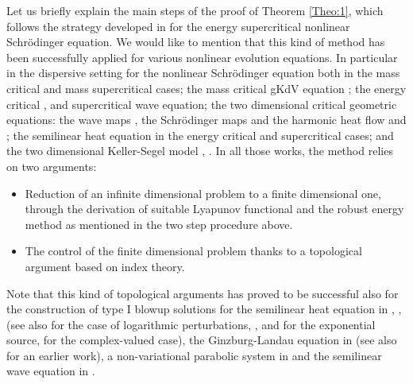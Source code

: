 \documentclass[11pt]{aims}
\theoremstyle{definition}
\numberwithin{equation}{section}
\begin{document}
Let us briefly explain the main steps of the proof of Theorem \ref{Theo:1}, which follows the strategy developed  in \cite{MRRcjm15} for the energy supercritical nonlinear Schr\"odinger equation. We would like to mention that this kind of method has been successfully applied for various nonlinear evolution equations. In particular in the dispersive setting for the nonlinear Schr\"odinger equation both in the mass critical \cite{MRgfa03,MRim04, MRam05, MRcmp05} and mass supercritical \cite{MRRcjm15} cases; the mass critical gKdV equation \cite{MMRam14, MMRasp15, MMRjems15};  the energy critical \cite{DKMcjm13}, \cite{HRapde12} and supercritical \cite{Car161} wave equation; the two dimensional critical geometric equations: the wave maps \cite{RRmihes12}, the Schr\"odinger maps \cite{MRRim13} and the harmonic heat flow \cite{RScpam13, RSapde2014} and \cite{IGN16}; the semilinear heat equation in the energy critical \cite{Sjfa12} and supercritical \cite{Car16} cases; and the two dimensional Keller-Segel model \cite{RSma14}, \cite{GMarx16}. In all those works, the method relies on two arguments:
\begin{itemize}
\item Reduction of an infinite dimensional problem to a finite dimensional one, through the derivation of suitable Lyapunov functional and the robust energy method as mentioned in the two step procedure above.
\item The control of the finite dimensional problem thanks to a topological argument based on index theory.
\end{itemize}
Note that this kind of topological arguments has proved to be successful also for the construction of type I blowup solutions for the semilinear heat equation in \cite{BKnon94}, \cite{MZdm97}, \cite{NZens16} (see also \cite{NZsns16} for the case of logarithmic perturbations, \cite{Breiumj90}, \cite{Brejde92} and \cite{GNZpre16a} for the exponential source, \cite{NZcpde15} for the complex-valued case), the Ginzburg-Landau equation in \cite{MZjfa08} (see also \cite{ZAAihn98} for an earlier work), a non-variational parabolic system in \cite{GNZpre16c} and the semilinear wave equation in \cite{CZcpam13}.\\ 
  
\end{document}
